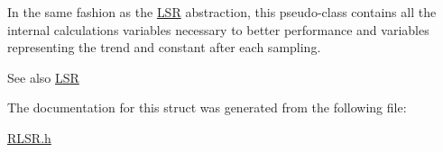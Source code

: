 In the same fashion as the \hyperlink{struct_l_s_r}{L\+S\+R} abstraction, this pseudo-\/class contains all the internal calculations variables necessary to better performance and variables representing the trend and constant after each sampling.

\begin{DoxySeeAlso}{See also}
\hyperlink{struct_l_s_r}{L\+S\+R} 
\end{DoxySeeAlso}


The documentation for this struct was generated from the following file\+:\begin{DoxyCompactItemize}
\item 
\hyperlink{_r_l_s_r_8h}{R\+L\+S\+R.\+h}\end{DoxyCompactItemize}
